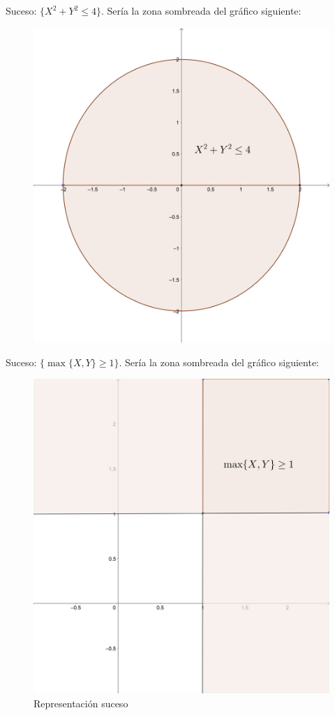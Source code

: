 \documentclass[]{book}
\begin{document}
Suceso: \(\{X^2+Y^2\leq 4\}\). Sería la zona sombreada del gráfico siguiente:

\begin{figure}

{\centering \includegraphics{Images/Bidim2} 

}

\end{figure}

Suceso: \(\{\max\{X,Y\}\geq 1\}\). Sería la zona sombreada del gráfico siguiente:

\begin{figure}
\centering
\includegraphics{Images/Bidim3.png}
\caption{\label{fig:bid3}Representación suceso}
\end{figure}
\end{document}
